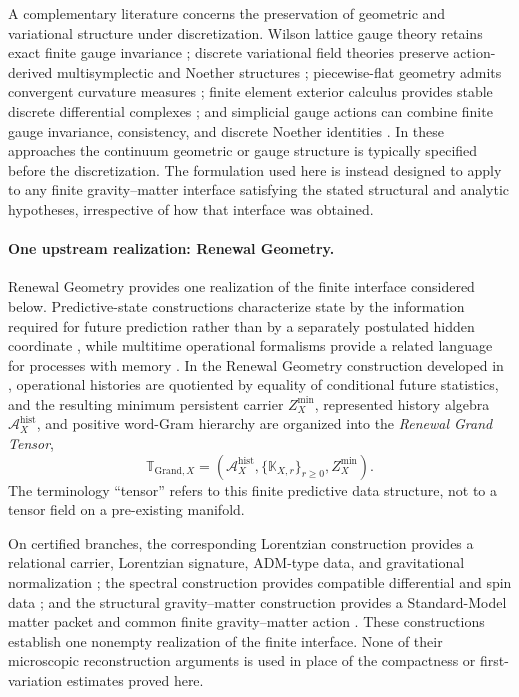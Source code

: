 \documentclass[11pt]{article}
\numberwithin{equation}{section}
\theoremstyle{definition}
\theoremstyle{remark}
\begin{document}
A complementary literature concerns the preservation of geometric and
variational structure under discretization.  Wilson lattice gauge theory
retains exact finite gauge invariance \cite{Wilson1974}; discrete variational
field theories preserve action-derived multisymplectic and Noether structures
\cite{MarsdenPatrickShkoller1998}; piecewise-flat geometry admits convergent
curvature measures \cite{CheegerMullerSchrader1984}; finite element exterior
calculus provides stable discrete differential complexes
\cite{ArnoldFalkWinther2006,ArnoldFalkWinther2010}; and simplicial gauge
actions can combine finite gauge invariance, consistency, and discrete Noether
identities \cite{ChristiansenHalvorsen2012}.  In these approaches the
continuum geometric or gauge structure is typically specified before the
discretization.  The formulation used here is instead designed to apply to
any finite gravity--matter interface satisfying the stated structural and
analytic hypotheses, irrespective of how that interface was obtained.

\paragraph{One upstream realization: Renewal Geometry.}

Renewal Geometry provides one realization of the finite interface considered
below.  Predictive-state constructions characterize state by the information
required for future prediction rather than by a separately postulated hidden
coordinate \cite{ShaliziCrutchfield2001}, while multitime operational
formalisms provide a related language for processes with memory
\cite{ChiribellaEtAl2009,PollockEtAl2018}.  In the Renewal Geometry
construction developed in
\cite{PelissierRenewalSpacetime2026,PelissierSpectral2026}, operational
histories are quotiented by equality of conditional future statistics, and the
resulting minimum persistent carrier
$Z_X^{\min}$, represented history algebra
$\mathcal A_X^{\mathrm{hist}}$, and positive word-Gram hierarchy are organized
into the \emph{Renewal Grand Tensor},
\begin{equation}
\boldsymbol{\mathbb T}_{\mathrm{Grand},X}
=
\left(
\mathcal A_X^{\mathrm{hist}},
\{\mathbb K_{X,r}\}_{r\ge0},
Z_X^{\min}
\right).
\label{eq:intro-grand-tensor}
\end{equation}
The terminology ``tensor'' refers to this finite predictive data structure,
not to a tensor field on a pre-existing manifold.

On certified branches, the corresponding Lorentzian construction provides a
relational carrier, Lorentzian signature, ADM-type data, and gravitational
normalization \cite{PelissierRenewalSpacetime2026}; the spectral construction
provides compatible differential and spin data
\cite{PelissierSpectral2026}; and the structural gravity--matter construction
provides a Standard-Model matter packet and common finite gravity--matter
action \cite{PelissierDuality2026}.  These constructions establish one
nonempty realization of the finite interface.  None of their microscopic
reconstruction arguments is used in place of the compactness or
first-variation estimates proved here.
\end{document}
